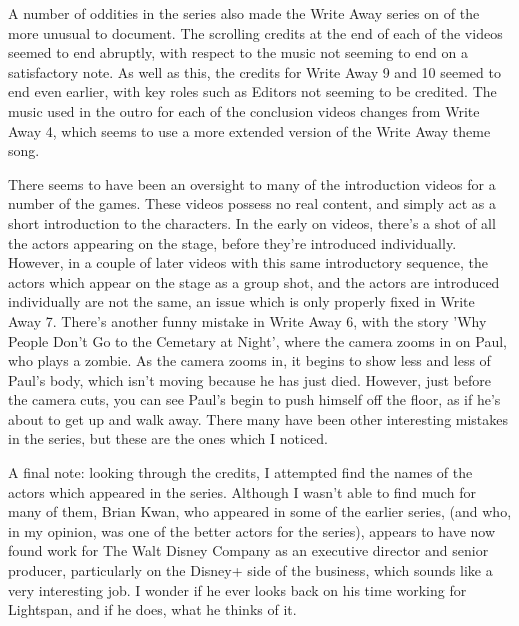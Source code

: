 A number of oddities in the series also made the Write Away series on of the more unusual to document.
The scrolling credits at the end of each of the videos seemed to end abruptly, with respect to the music not seeming to end on a satisfactory note.
As well as this, the credits for Write Away 9 and 10 seemed to end even earlier, with key roles such as Editors not seeming to be credited.
The music used in the outro for each of the conclusion videos changes from Write Away 4, which seems to use a more extended version of the Write Away theme song.

There seems to have been an oversight to many of the introduction videos for a number of the games.
These videos possess no real content, and simply act as a short introduction to the characters.
In the early on videos, there's a shot of all the actors appearing on the stage, before they're introduced individually.
However, in a couple of later videos with this same introductory sequence, the actors which appear on the stage as a group shot, and the actors are introduced individually are not the same, an issue which is only properly fixed in Write Away 7.
There's another funny mistake in Write Away 6, with the story 'Why People Don't Go to the Cemetary at Night', where the camera zooms in on Paul, who plays a zombie.
As the camera zooms in, it begins to show less and less of Paul's body, which isn't moving because he has just died.
However, just before the camera cuts, you can see Paul's begin to push himself off the floor, as if he's about to get up and walk away.
There many have been other interesting mistakes in the series, but these are the ones which I noticed.

A final note: looking through the credits, I attempted find the names of the actors which appeared in the series.
Although I wasn't able to find much for many of them, Brian Kwan, who appeared in some of the earlier series, (and who, in my opinion, was one of the better actors for the series), appears to have now found work for The Walt Disney Company as an executive director and senior producer, particularly on the Disney+ side of the business, which sounds like a very interesting job.
I wonder if he ever looks back on his time working for Lightspan, and if he does, what he thinks of it.